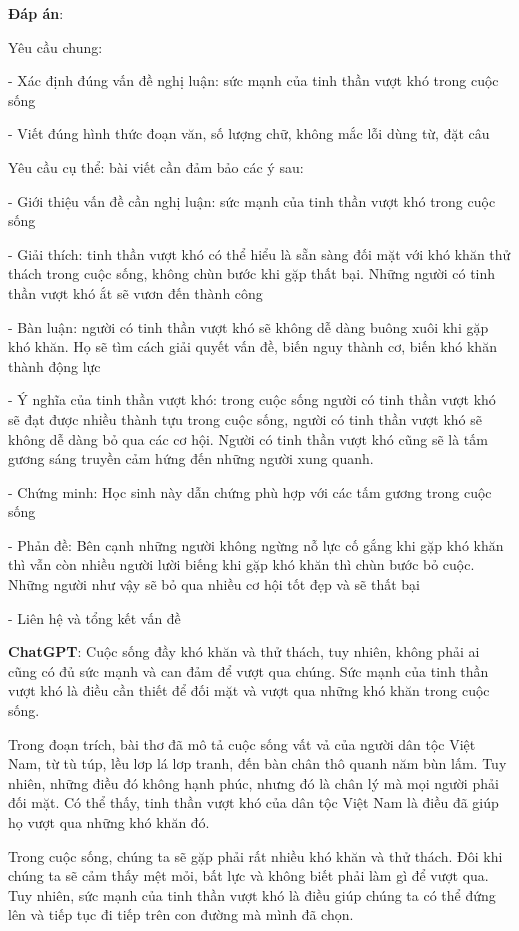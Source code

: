 \documentclass{article}
\begin{document}
{\begin{mdframed}[linewidth=1pt,linecolor=red]
		\textbf{Đáp án}:
		
		Yêu cầu chung:
		
		- Xác định đúng vấn đề nghị luận: sức mạnh của tinh thần vượt khó trong cuộc sống
		
		- Viết đúng hình thức đoạn văn, số lượng chữ, không mắc lỗi dùng từ, đặt câu
		
		Yêu cầu cụ thể: bài viết cần đảm bảo các ý sau:
		
		- Giới thiệu vấn đề cần nghị luận: sức mạnh của tinh thần vượt khó trong cuộc sống
		
		- Giải thích: tinh thần vượt khó có thể hiểu là sẵn sàng đối mặt với khó khăn thử thách trong cuộc sống, không chùn bước khi gặp thất bại. Những người có tinh thần vượt khó ắt sẽ vươn đến thành công
		
		- Bàn luận: người có tinh thần vượt khó sẽ không dễ dàng buông xuôi khi gặp khó khăn. Họ sẽ tìm cách giải quyết vấn đề, biến nguy thành cơ, biến khó khăn thành động lực
		
		- Ý nghĩa của tinh thần vượt khó: trong cuộc sống người có tinh thần vượt khó sẽ đạt được nhiều thành tựu trong cuộc sống, người có tinh thần vượt khó sẽ không dễ dàng bỏ qua các cơ hội. Người có tinh thần vượt khó cũng sẽ là tấm gương sáng truyền cảm hứng đến những người xung quanh.
		
		- Chứng minh: Học sinh này dẫn chứng phù hợp với các tấm gương trong cuộc sống
		
		- Phản đề: Bên cạnh những người không ngừng nỗ lực cố gắng khi gặp khó khăn thì vẫn còn nhiều người lười biếng khi gặp khó khăn thì chùn bước bỏ cuộc. Những người như vậy sẽ bỏ qua nhiều cơ hội tốt đẹp và sẽ thất bại
		
		- Liên hệ và tổng kết vấn đề
		
		\textbf{ChatGPT}:
		Cuộc sống đầy khó khăn và thử thách, tuy nhiên, không phải ai cũng có đủ sức mạnh và can đảm để vượt qua chúng. Sức mạnh của tinh thần vượt khó là điều cần thiết để đối mặt và vượt qua những khó khăn trong cuộc sống.
		
		Trong đoạn trích, bài thơ đã mô tả cuộc sống vất vả của người dân tộc Việt Nam, từ tù túp, lều lơp lá lơp tranh, đến bàn chân thô quanh năm bùn lấm. Tuy nhiên, những điều đó không hạnh phúc, nhưng đó là chân lý mà mọi người phải đối mặt. Có thể thấy, tinh thần vượt khó của dân tộc Việt Nam là điều đã giúp họ vượt qua những khó khăn đó.
		
		Trong cuộc sống, chúng ta sẽ gặp phải rất nhiều khó khăn và thử thách. Đôi khi chúng ta sẽ cảm thấy mệt mỏi, bất lực và không biết phải làm gì để vượt qua. Tuy nhiên, sức mạnh của tinh thần vượt khó là điều giúp chúng ta có thể đứng lên và tiếp tục đi tiếp trên con đường mà mình đã chọn.
		

\end{mdframed}}
\end{document}
